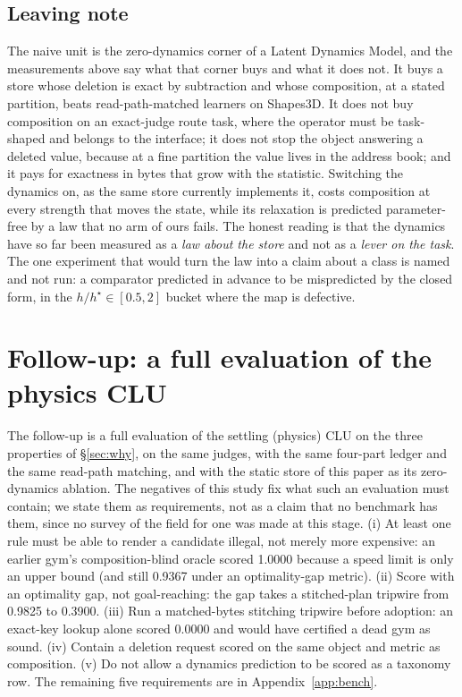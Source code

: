 \documentclass{article} %
\begin{document}
\subsection{Leaving note}
\label{sec:leaving}

The naive unit is the zero-dynamics corner of a Latent Dynamics Model, and the measurements above
say what that corner buys and what it does not. It buys a store whose deletion is exact by
subtraction and whose composition, at a stated partition, beats read-path-matched learners on
Shapes3D. It does not buy composition on an exact-judge route task, where the operator must be
task-shaped and belongs to the interface; it does not stop the object answering a deleted value,
because at a fine partition the value lives in the address book; and it pays for exactness in
bytes that grow with the statistic. Switching the dynamics on, as the same store currently
implements it, costs composition at every strength that moves the state, while its relaxation is
predicted parameter-free by a law that no arm of ours fails. The honest reading is that the
dynamics have so far been measured as a \emph{law about the store} and not as a \emph{lever on
the task}. The one experiment that would turn the law into a claim about a class is named and not
run: a comparator predicted in advance to be mispredicted by the closed form, in the
$h/h^\star\in[0.5,2]$ bucket where the map is defective.

\section{Follow-up: a full evaluation of the physics CLU}
\label{sec:followup}

The follow-up is a full evaluation of the settling (physics) CLU on the three properties of
\S\ref{sec:why}, on the same judges, with the same four-part ledger and the same read-path
matching, and with the static store of this paper as its zero-dynamics ablation. The negatives of
this study fix what such an evaluation must contain; we state them as requirements, not as a claim
that no benchmark has them, since no survey of the field for one was made at this stage.
(i) At least one rule must be able to render a candidate illegal, not merely more expensive: an
earlier gym's composition-blind oracle scored 1.0000 because a speed limit is only an upper bound
(and still 0.9367 under an optimality-gap metric). %
(ii) Score with an optimality gap, not goal-reaching: the gap takes a stitched-plan tripwire from
0.9825 to 0.3900. %
(iii) Run a matched-bytes stitching tripwire before adoption: an exact-key lookup alone scored
0.0000 and would have certified a dead gym as sound. %
(iv) Contain a deletion request scored on the same object and metric as composition.
(v) Do not allow a dynamics prediction to be scored as a taxonomy row. The remaining five
requirements are in Appendix~\ref{app:bench}.
\end{document}

